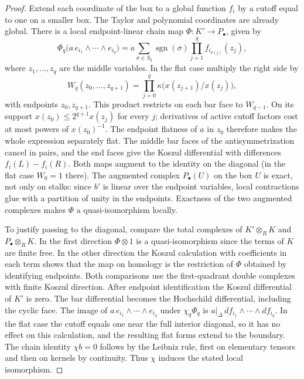 \documentclass[11pt,oneside,reqno]{article}
\theoremstyle{plain}
\theoremstyle{definition}
\theoremstyle{remark}
\begin{document}
\begin{proof}
Extend each coordinate of the box to a global function \(f_i\)
by a cutoff equal to one on a smaller box. The Taylor and
polynomial coordinates are already global. There is a local
endpoint-linear chain map \(\Phi:K'\to P_\bullet\), given by
\[
 \Phi_q\bigl(a\,e_{i_1}\wedge\cdots\wedge e_{i_q}\bigr)
   =a\sum_{\sigma\in S_q}\operatorname{sgn}(\sigma)
       \prod_{j=1}^q f_{i_{\sigma(j)}}(z_j),
\]
where \(z_1,\ldots,z_q\) are the middle variables. In the flat
case multiply the right side by
\[
 W_q(z_0,\ldots,z_{q+1})
     =\prod_{j=0}^{q}\kappa\bigl(x(z_{j+1})/x(z_j)\bigr),
\]
with endpoints \(z_0,z_{q+1}\). This product restricts on each
bar face to \(W_{q-1}\). On its support \(x(z_0)\le 2^{q+1}x(z_j)\)
for every \(j\); derivatives of active cutoff factors cost at most
powers of \(x(z_0)^{-1}\). The endpoint flatness of \(a\) in \(z_0\)
therefore makes the whole expression separately flat. The middle
bar faces of the antisymmetrization cancel in pairs, and the end
faces give the Koszul differential with differences \(f_i(L)-f_i(R)\).
Both maps augment to the identity on the diagonal (in the flat
case \(W_0=1\) there). The augmented complex \(P_\bullet(U)\) on the box
\(U\) is exact, not only on stalks: since \(b'\) is linear over the
endpoint variables, local contractions glue with a partition of unity
in the endpoints. Exactness of the two augmented complexes
makes \(\Phi\) a quasi-isomorphism locally.

To justify passing to the diagonal, compare the total complexes
of \(K'\otimes_R K\) and \(P_\bullet\otimes_R K\). In the first
direction \(\Phi\otimes 1\) is a quasi-isomorphism since the terms
of \(K\) are finite free. In the other direction the Koszul
calculation with coefficients in each term shows that the map on
homology is the restriction of \(\Phi\) obtained by identifying
endpoints. Both comparisons use the first-quadrant double complexes
with finite Koszul direction. After endpoint identification the
Koszul differential of \(K'\) is zero. The bar differential
becomes the Hochschild differential, including the cyclic face.
The image of \(a\,e_{i_1}\wedge\cdots\wedge e_{i_q}\) under \(\chi_q\Phi_q\)
is \(a|_\Delta\,df_{i_1}\wedge\cdots\wedge df_{i_q}\). In the flat case the
cutoff equals one near the full interior diagonal, so it has no
effect on this calculation, and the resulting flat forms extend
to the boundary. The chain identity \(\chi b=0\) follows by the
Leibniz rule, first on elementary tensors and then on kernels
by continuity. Thus \(\chi\) induces the stated local isomorphism.


\end{proof}
\end{document}
